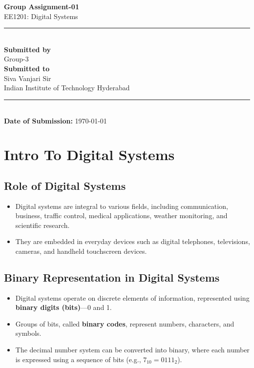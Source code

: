 \documentclass[a4paper,12pt]{article}
\begin{document}
\begin{titlepage}
    \centering
    
    \vspace{1cm}
    
    {\Huge \textbf{Group Assignment-01}}\\[1cm]
    {\LARGE EE1201: Digital Systems}\\[1.5cm]
    
    \rule{\linewidth}{0.5mm}\\[0.5cm]
    {\Large \textbf{Submitted by}}\\[0.3cm]
    {\large Group-3}\\[1cm]
   
    {\Large \textbf{Submitted to}}\\[0.3cm]
    {\large Siva Vanjari Sir}\\
    {\large Indian Institute of Technology Hyderabad}\\[1.5cm]
    
    \rule{\linewidth}{0.5mm}\\[1.5cm]
    {\large \textbf{Date of Submission:} \today}\\[2cm]
    
    \vfill

\end{titlepage}

\newpage
\section{Intro To Digital Systems}
\subsection{Role of Digital Systems}
\begin{itemize}
    \item Digital systems are integral to various fields, including communication, business, traffic control, medical applications, weather monitoring, and scientific research.
    \item They are embedded in everyday devices such as digital telephones, televisions, cameras, and handheld touchscreen devices.
\end{itemize}

\subsection{Binary Representation in Digital Systems}
\begin{itemize}
    \item Digital systems operate on discrete elements of information, represented using \textbf{binary digits (bits)}—0 and 1.
    \item Groups of bits, called \textbf{binary codes}, represent numbers, characters, and symbols.
    \item The decimal number system can be converted into binary, where each number is expressed using a sequence of bits (e.g., $7_{10} = 0111_2$).
\end{itemize}
\end{document}
